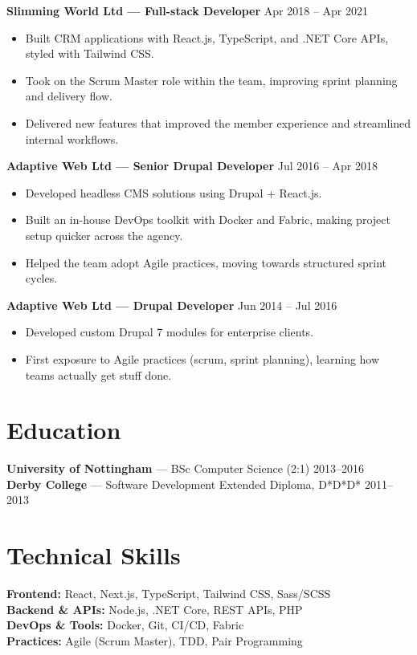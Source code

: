 \documentclass[11pt,a4paper]{article}
\begin{document}
\textbf{Slimming World Ltd --- Full-stack Developer} \hfill Apr 2018 -- Apr 2021 \\
\begin{itemize}
  \item Built CRM applications with React.js, TypeScript, and .NET Core APIs, styled with Tailwind CSS.
  \item Took on the Scrum Master role within the team, improving sprint planning and delivery flow.
  \item Delivered new features that improved the member experience and streamlined internal workflows.
\end{itemize}

\textbf{Adaptive Web Ltd --- Senior Drupal Developer} \hfill Jul 2016 -- Apr 2018 \\
\begin{itemize}
  \item Developed headless CMS solutions using Drupal + React.js.
  \item Built an in-house DevOps toolkit with Docker and Fabric, making project setup quicker across the agency.
  \item Helped the team adopt Agile practices, moving towards structured sprint cycles.
\end{itemize}

\textbf{Adaptive Web Ltd --- Drupal Developer} \hfill Jun 2014 -- Jul 2016 \\
\begin{itemize}
  \item Developed custom Drupal 7 modules for enterprise clients.
  \item First exposure to Agile practices (scrum, sprint planning), learning how teams actually get stuff done.
\end{itemize}

\section*{Education}
\textbf{University of Nottingham} --- BSc Computer Science (2:1) \hfill 2013--2016 \\
\textbf{Derby College} --- Software Development Extended Diploma, D*D*D* \hfill 2011--2013

\section*{Technical Skills}
\textbf{Frontend:} React, Next.js, TypeScript, Tailwind CSS, Sass/SCSS \\
\textbf{Backend \& APIs:} Node.js, .NET Core, REST APIs, PHP \\
\textbf{DevOps \& Tools:} Docker, Git, CI/CD, Fabric \\
\textbf{Practices:} Agile (Scrum Master), TDD, Pair Programming
\end{document}
